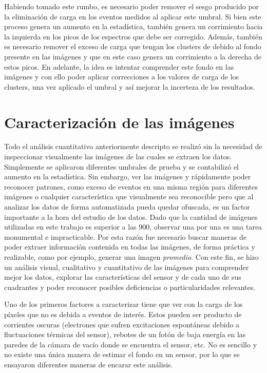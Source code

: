 Habiendo tomado este rumbo, es necesario poder remover el sesgo producido por la eliminación de carga en los eventos medidos al aplicar este umbral. Si bien este proceso genera un aumento en la estadística, también genera un corrimiento hacia la izquierda en los picos de los espectros que debe ser corregido. Además, también es necesario remover el exceso de carga que tengan los clusters de debido al fondo presente en las imágenes y que en este caso genera un corrimiento a la derecha de estos picos. En adelante, la idea es intentar comprender este fondo en las imágenes y con ello poder aplicar correcciones a los valores de carga de los clusters, una vez aplicado el umbral y así mejorar la incerteza de los resultados.

\section{Caracterización de las imágenes}
\noindent Todo el análisis cuantitativo anteriormente descripto se realizó sin la necesidad de inspeccionar visualmente las imágenes de las cuales se extraen los datos. Simplemente se aplicaron diferentes umbrales de prueba y se contabilizó el aumento en la estadística. Sin embargo, ver las imágenes y rápidamente poder reconocer patrones, como exceso de eventos en una misma región para diferentes imágenes o cualquier característica que visualmente sea reconocible pero que al analizar los datos de forma automatizada pueda quedar ofuscada, es un factor importante a la hora del estudio de los datos. Dado que la cantidad de imágenes utilizadas en este trabajo es superior a las $900$, observar una por una es una tarea monumental e impracticable. Por esta razón fue necesario buscar maneras de poder extraer información contenida en todas las imágenes, de forma práctica y realizable, como por ejemplo, generar una imagen \textit{promedio}. Con este fin, se hizo un análisis visual, cualitativo y cuantitativo de las imágenes para comprender mejor los datos, explorar las características del sensor y de cada uno de sus cuadrantes y poder reconocer posibles deficiencias o particularidades relevantes.

Uno de los primeros factores a caracterizar tiene que ver con la carga de los píxeles que no es debida a eventos de interés. Estos pueden ser producto de corrientes oscuras (electrones que sufren excitaciones espontáneas debido a fluctuaciones térmicas del sensor), rebotes de un fotón de baja energía en las paredes de la cámara de vacío donde se encuentra el sensor, etc. No es sencillo y no existe una única manera de estimar el fondo en un sensor, por lo que se ensayaron diferentes maneras de encarar este análisis.

